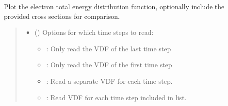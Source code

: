 \documentclass[letterpaper,10pt,english,openany,oneside]{sphinxmanual}
\begin{document}
\begin{fulllineitems}
\begin{fulllineitems}
\label{\detokenize{api/pytb.ThunderBoltz.plot_edfs:pytb.ThunderBoltz.plot_edfs}}
\pysigstartsignatures
{}
\pysigstopsignatures
\sphinxAtStartPar
Plot the electron total energy distribution function, optionally
include the provided cross sections for comparison.
\begin{quote}\begin{description}
\begin{itemize}
\item {} 
\sphinxAtStartPar
{} (\sphinxstyleliteralemphasis{\sphinxupquote{, }}\sphinxstyleliteralemphasis{\sphinxupquote{{[}}}\sphinxstyleliteralemphasis{\sphinxupquote{{]}}}) \textendash{} 
\sphinxAtStartPar
Options for which time steps to
read:
\begin{itemize}
\item {} 
\sphinxAtStartPar
{}: Only read the VDF of the last time step

\item {} 
\sphinxAtStartPar
{}: Only read the VDF of the first time step

\item {} 
\sphinxAtStartPar
{}: Read a separate VDF for each time step.

\item {} 
\sphinxAtStartPar
{}: Read VDF for each time step included in list.


\end{itemize}
\end{itemize}
\end{description}
\end{quote}
\end{fulllineitems}
\end{fulllineitems}
\end{document}
